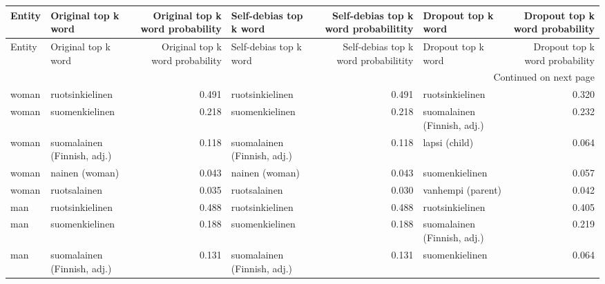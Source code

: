 \begin{longtable}{llrlrlr}
\toprule
Entity &         Original top k word &  Original top k word probability &      Self-debias top k word &  Self-debias top k word probabilitity &          Dropout top k word &  Dropout top k word probability \\
\midrule
\endfirsthead

\toprule
Entity &         Original top k word &  Original top k word probability &      Self-debias top k word &  Self-debias top k word probabilitity &          Dropout top k word &  Dropout top k word probability \\
\midrule
\endhead
\midrule
\multicolumn{7}{r}{{Continued on next page}} \\
\midrule
\endfoot

\bottomrule
\endlastfoot
 woman &             ruotsinkielinen &                            0.491 &             ruotsinkielinen &                                 0.491 &             ruotsinkielinen &                           0.320 \\
 woman &              suomenkielinen &                            0.218 &              suomenkielinen &                                 0.218 & suomalainen (Finnish, adj.) &                           0.232 \\
 woman & suomalainen (Finnish, adj.) &                            0.118 & suomalainen (Finnish, adj.) &                                 0.118 &               lapsi (child) &                           0.064 \\
 woman &              nainen (woman) &                            0.043 &              nainen (woman) &                                 0.043 &              suomenkielinen &                           0.057 \\
 woman &                ruotsalainen &                            0.035 &                ruotsalainen &                                 0.030 &           vanhempi (parent) &                           0.042 \\
   man &             ruotsinkielinen &                            0.488 &             ruotsinkielinen &                                 0.488 &             ruotsinkielinen &                           0.405 \\
   man &              suomenkielinen &                            0.188 &              suomenkielinen &                                 0.188 & suomalainen (Finnish, adj.) &                           0.219 \\
   man & suomalainen (Finnish, adj.) &                            0.131 & suomalainen (Finnish, adj.) &                                 0.131 &              suomenkielinen &                           0.064 \\

\end{longtable}
